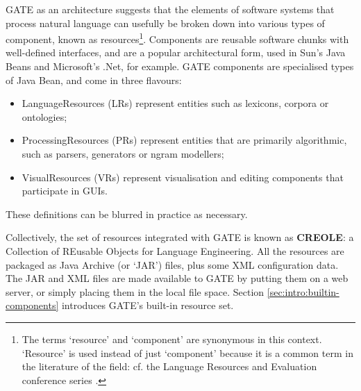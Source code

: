 


GATE as an architecture suggests that the elements of software systems that
process natural language can usefully be broken down into various types of
component, known as resources\footnote{The terms `resource' and `component' are
synonymous in this context. `Resource' is used instead of just `component'
because it is a common term in the literature of the field: cf. the Language
Resources and Evaluation conference series \cite{Lrec98,Lrec00}.}. Components
are reusable software chunks with well-defined interfaces, and are a popular
architectural form, used in Sun's Java Beans and Microsoft's .Net, for
example. GATE components are specialised types of Java Bean, and come in
three flavours:
%
\begin{itemize}
%
\item
LanguageResources (LRs) represent entities such as lexicons, corpora or
ontologies;
%
\item
ProcessingResources (PRs) represent entities that are primarily algorithmic,
such as parsers, generators or ngram modellers;
%
\item
VisualResources (VRs) represent visualisation and editing components that
participate in GUIs.
%
\end{itemize}
%
These definitions can be blurred in practice as necessary.

Collectively, the set of resources integrated with GATE is known as
{\bf CREOLE}: a
Collection of REusable Objects for Language Engineering. All the resources are
packaged as Java Archive (or `JAR') files, plus some XML configuration data.
The JAR and XML files are made available to GATE by putting them on a web
server, or simply placing them in the local file space.
Section \ref{sec:intro:builtin-components} introduces GATE's built-in resource
set.

